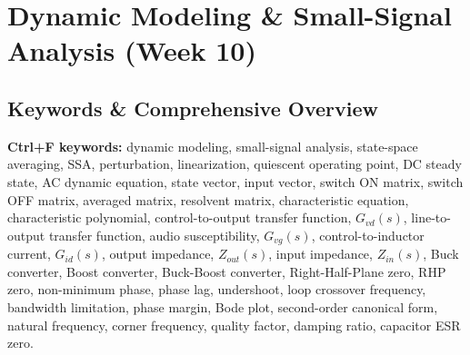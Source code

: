 \section{Dynamic Modeling \& Small-Signal Analysis (Week 10)}

\subsection{Keywords \& Comprehensive Overview}
\noindent\textbf{Ctrl+F keywords:} dynamic modeling, small-signal analysis, state-space averaging, SSA, perturbation, linearization, quiescent operating point, DC steady state, AC dynamic equation, state vector, input vector, switch ON matrix, switch OFF matrix, averaged matrix, resolvent matrix, characteristic equation, characteristic polynomial, control-to-output transfer function, $G_{vd}(s)$, line-to-output transfer function, audio susceptibility, $G_{vg}(s)$, control-to-inductor current, $G_{id}(s)$, output impedance, $Z_{out}(s)$, input impedance, $Z_{in}(s)$, Buck converter, Boost converter, Buck-Boost converter, Right-Half-Plane zero, RHP zero, non-minimum phase, phase lag, undershoot, loop crossover frequency, bandwidth limitation, phase margin, Bode plot, second-order canonical form, natural frequency, corner frequency, quality factor, damping ratio, capacitor ESR zero.

